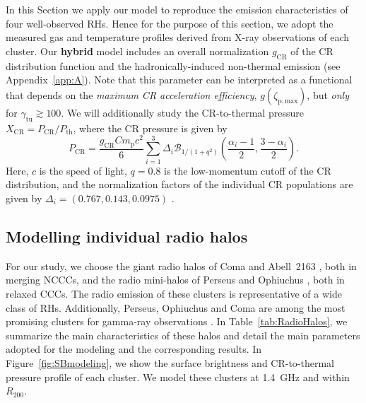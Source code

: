 \documentclass[traditabstract]{aa}
\def\C#1{{\bf #1}}
\newcommand{\rmn}{\mathrm}
\begin{document}
In this Section we apply our model to reproduce the emission characteristics of
four well-observed RHs. Hence for the purpose of this section, we adopt the
measured gas and temperature profiles derived from X-ray observations of each cluster.  
Our \C{hybrid} model includes an overall normalization $g_{\rmn{CR}}$ of the CR
distribution function and the hadronically-induced non-thermal emission 
(see Appendix~\ref{app:A}). Note that
this parameter can be interpreted as a functional that depends on the
\emph{maximum CR acceleration efficiency}, $g(\zeta_{\rmn{p,max}})$,
\citep{2010MNRAS.409..449P} but \emph{only} for
$\gamma_{\rmn{tu}}\gtrsim100$. We will additionally study the CR-to-thermal
pressure $X_{\rmn{CR}}=P_{\rmn{CR}}/P_{\rmn{th}}$, where the CR pressure is
given by
\begin{equation}
  \label{eq:PCR}
  P_{\rmn{CR}}=\frac{g_{\rmn{CR}} C m_{\rmn{p}} c^{2}}{6}
  \sum_{i=1}^{3} \Delta_{i} \mathcal{B}_{1/(1+q^2)} \left(
    \frac{\alpha_{i}-1}{2},\frac{3-\alpha_{i}}{2} \right).
\end{equation}
Here, $c$ is the speed of light, $q=0.8$ is the low-momentum cutoff of the CR
distribution, and the normalization factors of the individual CR populations are
given by $\Delta_{i} = (0.767, 0.143, 0.0975)$ \citep[][see also
Appendix~\ref{app:A}]{2010MNRAS.409..449P}.


\subsection{Modelling individual radio halos}

For our study, we choose the giant radio halos of Coma
\citep{1997A&A...321...55D} and Abell~2163
\citep{2001A&A...373..106F,2009A&A...499..679M}, both in merging NCCCs, and the
radio mini-halos of Perseus \citep{1990MNRAS.246..477P} and Ophiuchus
\citep{2009A&A...499..371G,2009A&A...499..679M}, both in relaxed CCCs. The radio
emission of these clusters is representative of a wide class of RHs.
Additionally, Perseus, Ophiuchus and Coma are among the most promising clusters
for gamma-ray observations \citep{2010MNRAS.409..449P,2011arXiv1105.3240P}. In
Table~\ref{tab:RadioHalos}, we summarize the main characteristics of these halos
and detail the main parameters adopted for the modeling and the corresponding
results. In Figure~\ref{fig:SBmodeling}, we show the surface brightness and
CR-to-thermal pressure profile of each cluster. We model these clusters at
1.4~GHz and within $R_{200}$.
\end{document}
